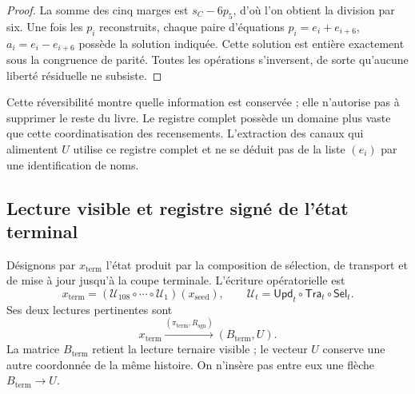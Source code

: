 \begin{proof}
La somme des cinq marges est \(s_C-6p_5\), d'où l'on obtient la
division par six. Une fois les \(p_i\) reconstruits, chaque paire d'équations
\(p_i=e_i+e_{i+6}\), \(a_i=e_i-e_{i+6}\) possède la solution indiquée.
Cette solution est entière exactement sous la congruence de parité. Toutes
les opérations s'inversent, de sorte qu'aucune liberté résiduelle ne subsiste.
\end{proof}

Cette réversibilité montre quelle information est conservée ; elle n'autorise pas à
supprimer le reste du livre. Le registre complet possède un domaine plus vaste
que cette coordinatisation des recensements. L'extraction des canaux qui alimentent
\(U\) utilise ce registre complet et ne se déduit pas de la liste
\((e_i)\) par une identification de noms.





\subsection{Lecture visible et registre signé de l’état terminal}
\label{subsec:k-terminal}

Désignons par \(x_{\mathrm{term}}\) l'état produit par la composition de sélection, de transport et de mise à jour jusqu'à la coupe terminale. L'écriture opératorielle est
\[
 x_{\mathrm{term}}=
 (\mathcal U_{108}\circ\cdots\circ\mathcal U_1)(x_{\mathrm{seed}}),
 \qquad \mathcal U_t=\mathsf{Upd}_t\circ\mathsf{Tra}_t\circ\mathsf{Sel}_t.
\]
Ses deux lectures pertinentes sont
\[
 x_{\mathrm{term}}
 \xrightarrow{(\pi_{\mathrm{term}},R_{\mathrm{sgn}})}
 (B_{\mathrm{term}},U).
\]
La matrice \(B_{\mathrm{term}}\) retient la lecture ternaire visible ; le vecteur \(U\) conserve une autre coordonnée de la même histoire. On n'insère pas entre eux une flèche \(B_{\mathrm{term}}\to U\).

